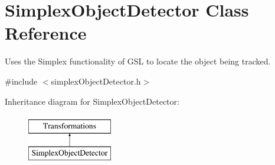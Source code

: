 \hypertarget{class_simplex_object_detector}{}\section{Simplex\+Object\+Detector Class Reference}
\label{class_simplex_object_detector}


Uses the Simplex functionality of G\+S\+L to locate the object being tracked.  




{\ttfamily \#include $<$simplex\+Object\+Detector.\+h$>$}

Inheritance diagram for Simplex\+Object\+Detector\+:\begin{figure}[H]
\begin{center}
\leavevmode
\includegraphics[height=2.000000cm]{class_simplex_object_detector}
\end{center}
\end{figure}
